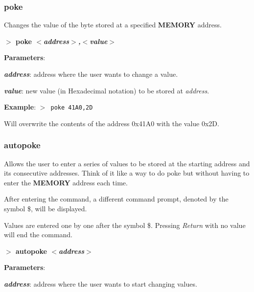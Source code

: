 \documentclass[a4paper,11pt]{article}
\begin{document}
        \subsubsection{{\color{blue}poke}}
        Changes the value of the byte stored at a specified \textbf{MEMORY}
        address.

        \hspace{1.9cm}\textbf{$>$ poke \textit{$<$address$>$,$<$value$>$}}

        \textbf{Parameters}:

        \hspace{1cm}\textbf{\textit{address}}: address where the user wants
        to change a value.
        
        \hspace{1cm}\textbf{\textit{value}}: new value (in Hexadecimal notation)
        to be stored at \textit{address}.

        \textbf{Example}: \texttt{$>$ poke 41A0,2D}

        Will overwrite the contents of the address 0x41A0 with the value
        0x2D.

        \subsubsection{{\color{blue}autopoke}}
        Allows the user to enter a series of values to be stored at the
        starting address and its consecutive addresses. Think of it like a
        way to do poke but without having to enter the \textbf{MEMORY}
        address each time.

        After entering the command, a different command prompt, denoted by
        the symbol \$, will be displayed.

        Values are entered one by one after the symbol \$. Pressing 
        \textit{Return} with no value will end the command.

        \hspace{1.9cm}\textbf{$>$ autopoke \textit{$<$address$>$}}

        \textbf{Parameters}:

        \hspace{1cm}\textbf{\textit{address}}: address where the user wants
        to start changing values.
\end{document}
